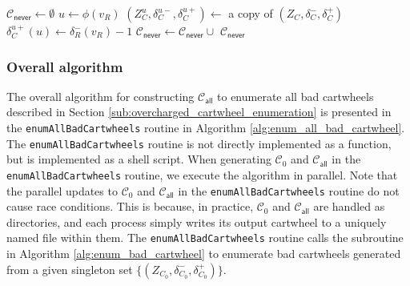 \documentclass[main.tex]{subfiles}
\begin{document}
\begin{algorithm}[H]
    \caption{($(Z_C, \delta_C^-, \delta_C^+), U_R, \phi, R$)}
    \label{alg:refine_never}
    \begin{algorithmic}[1]
        \State $\mathcal{C}_\textsf{never} \gets \emptyset$
            \State $u \gets \phi(v_R)$
            \State $(Z^u_{C}, \delta_{C}^{u-}, \delta_{C}^{u+}) \gets$ a copy of $(Z_C, \delta_C^-, \delta_C^+)$
            \State $\delta_{C}^{u+}(u) \gets \delta_R^-(v_R) - 1$
            \State $\mathcal{C}_\textsf{never} \gets \mathcal{C}_\textsf{never} \cup$ 
        \EndFor
        \State \Return $\mathcal{C}_\textsf{never}$
    \end{algorithmic}
\end{algorithm}


\subsubsection{Overall algorithm}
\newcommand{\enumAllBadCartwheels}{\texttt{enumAllBadCartwheels}\xspace}
The overall algorithm for constructing $\mathcal{C}_{\textsf{all}}$ to enumerate all bad cartwheels described in Section \ref{sub:overcharged_cartwheel_enumeration} is presented in the \enumAllBadCartwheels routine in Algorithm \ref{alg:enum_all_bad_cartwheel}.
The \enumAllBadCartwheels routine is not directly implemented as a \Cpp function, but is implemented as a shell script.
When generating $\mathcal{C}_0$ and $\mathcal{C}_{\textsf{all}}$ in the \enumAllBadCartwheels routine, we execute the algorithm in parallel.
Note that the parallel updates to $\mathcal{C}_0$ and $\mathcal{C}_{\textsf{all}}$ in the \enumAllBadCartwheels routine do not cause race conditions.
This is because, in practice, $\mathcal{C}_0$ and $\mathcal{C}_{\textsf{all}}$ are handled as directories, and each process simply writes its output cartwheel to a uniquely named file within them.
The \enumAllBadCartwheels routine calls the \enumBadCartwheels subroutine in Algorithm \ref{alg:enum_bad_cartwheel} to enumerate bad cartwheels generated from a given singleton set $\{(Z_{C_0}, \delta_{C_0}^-, \delta_{C_0}^+)\}$.
\end{document}
